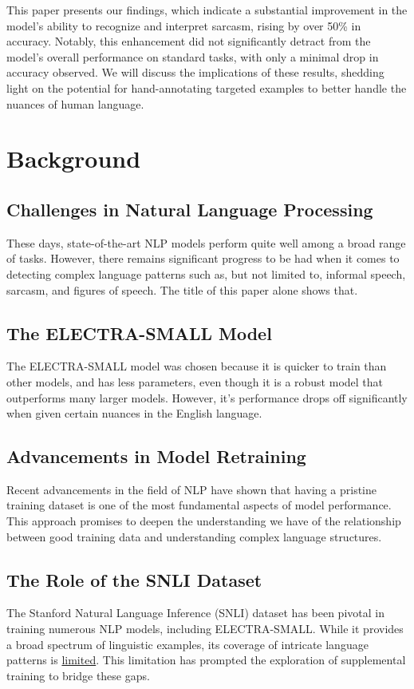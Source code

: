 \documentclass{article}
\begin{document}
This paper presents our findings, which indicate a substantial improvement in the model's ability to recognize and interpret sarcasm, rising by 
over 50\% in accuracy. Notably, this enhancement did not significantly detract from the model's overall performance on standard tasks, with 
only a minimal drop in accuracy observed. We will discuss the implications of these results, shedding light on the potential for hand-annotating
targeted examples to better handle the nuances of human language.

\section{Background}

\subsection{Challenges in Natural Language Processing}
These days, state-of-the-art NLP models perform quite well among a broad range of tasks. However, there remains significant progress
to be had when it comes to detecting complex language patterns such as, but not limited to, informal speech, sarcasm, and figures of speech. The title
of this paper alone shows that. 
\subsection{The ELECTRA-SMALL Model}
The ELECTRA-SMALL model was chosen because it is quicker to train than other models, and has less parameters, even though it is a robust
model that outperforms many larger models. However, it's performance drops off significantly when given certain nuances in the English language.
\subsection{Advancements in Model Retraining}
Recent advancements in the field of NLP have shown that having a pristine training dataset is one of the most fundamental aspects
of model performance. This approach promises to deepen the understanding we have of the relationship between good training data and 
understanding complex language structures.
\subsection{The Role of the SNLI Dataset}
The Stanford Natural Language Inference (SNLI) dataset has been pivotal in training numerous NLP models, including ELECTRA-SMALL. 
While it provides a broad spectrum of linguistic examples, its coverage of intricate language patterns is \href{https://nlp.stanford.edu/blog/the-stanford-nli-corpus-revisited/}{limited}. This limitation has 
prompted the exploration of supplemental training to bridge these gaps.
\end{document}
